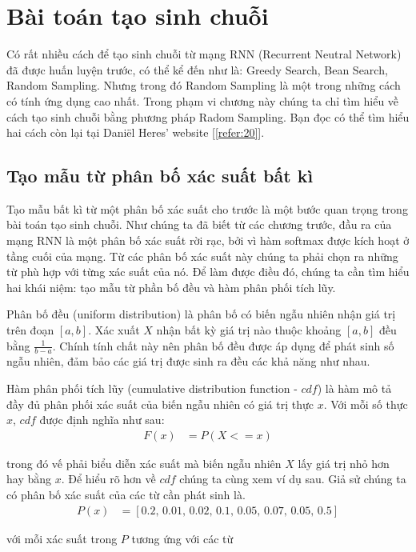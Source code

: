 \section{Bài toán tạo sinh chuỗi}

Có rất nhiều cách để tạo sinh chuỗi từ mạng RNN (Recurrent Neutral Network) đã được huấn luyện trước, có thể kể đến như là: Greedy Search, Bean Search, Random Sampling. Nhưng trong đó Random Sampling là một trong những cách có tính ứng dụng cao nhất. Trong phạm vi chương này chúng ta chỉ tìm hiểu về cách tạo sinh chuỗi bằng phương pháp Radom Sampling. Bạn đọc có thể tìm hiểu hai cách còn lại tại Daniël Heres' website [\ref{refer:20}].

\subsection{Tạo mẫu từ phân bố xác suất bất kì}
Tạo mẫu bất kì từ một phân bố xác suất cho trước là một bước quan trọng trong bài toán tạo sinh chuỗi. Như chúng ta đã biết từ các chương trước, đầu ra của mạng RNN là một phân bố xác suất rời rạc, bởi vì hàm softmax được kích hoạt ở tầng cuối của mạng. Từ các phân bố xác suất này chúng ta phải chọn ra những từ phù hợp với từng xác suất của nó. Để làm được điều đó, chúng ta cần tìm hiểu hai khái niệm: tạo mẫu từ phần bố đều và hàm phân phối tích lũy.

Phân bố đều (uniform distribution) là phân bố có biến ngẫu nhiên nhận giá trị trên đoạn $[a, b]$. Xác xuất $X$ nhận bất kỳ giá trị nào thuộc khoảng $[a, b]$ đều bằng $\frac{1}{b-a}$. Chính tính chất này nên phân bố đều được áp dụng để phát sinh số ngẫu nhiên, đảm bảo các giá trị được sinh ra đều các khả năng như nhau.

Hàm phân phối tích lũy (cumulative distribution function - $cdf$) là hàm mô tả đầy đủ phân phối xác suất của biến ngẫu nhiên có giá trị thực $x$. Với mỗi số thực $x$, $cdf$ được định nghĩa như sau:
\begin{align*}
  F(x) &= P(X <= x)
\end{align*}

trong đó vế phải biểu diễn xác suất mà biến ngẫu nhiên $X$ lấy giá trị nhỏ hơn hay bằng $x$. Để hiểu rõ hơn về $cdf$ chúng ta cùng xem ví dụ sau. Giả sử chúng ta có phân bố xác suất của các từ cần phát sinh là.
\begin{align*}
  P(x) &= [0.2, \, 0.01, \, 0.02, \, 0.1, \, 0.05, \, 0.07, \, 0.05, \, 0.5]
\end{align*}

với mỗi xác suất trong $P$ tương ứng với các từ 
\begin{align*}
  ["Hom", \, "nay", \, "toi", \, "di", \, "hoc", \, "Ngay", \, "mai", \, "cung"]
\end{align*}

